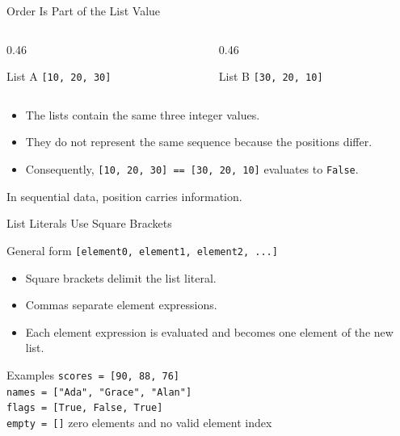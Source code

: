 \documentclass[aspectratio=169,10pt]{beamer}
\begin{document}
\begin{frame}{Order Is Part of the List Value}
  \begin{columns}[T,onlytextwidth]
    \begin{column}{0.46\textwidth}
      \begin{block}{List A}
        \centering
        \texttt{[10, 20, 30]}
      \end{block}
    \end{column}
    \begin{column}{0.46\textwidth}
      \begin{block}{List B}
        \centering
        \texttt{[30, 20, 10]}
      \end{block}
    \end{column}
  \end{columns}

  \begin{itemize}
    \item The lists contain the same three integer values.
    \item They do not represent the same sequence because the positions differ.
    \item Consequently, \texttt{[10, 20, 30] == [30, 20, 10]} evaluates to \texttt{False}.
  \end{itemize}

  \begin{keyidea}
    In sequential data, position carries information.
  \end{keyidea}
\end{frame}


\begin{frame}{List Literals Use Square Brackets}
  \begin{block}{General form}
    \centering
    \Large\texttt{[element0, element1, element2, ...]}
  \end{block}

  \begin{itemize}
    \item Square brackets delimit the list literal.
    \item Commas separate element expressions.
    \item Each element expression is evaluated and becomes one element of the new list.
  \end{itemize}

  \begin{block}{Examples}
    \texttt{scores = [90, 88, 76]}\\[0.06in]
    \texttt{names = ["Ada", "Grace", "Alan"]}\\[0.06in]
    \texttt{flags = [True, False, True]}\\[0.06in]
    \texttt{empty = []} \quad zero elements and no valid element index
  \end{block}
\end{frame}
\end{document}
